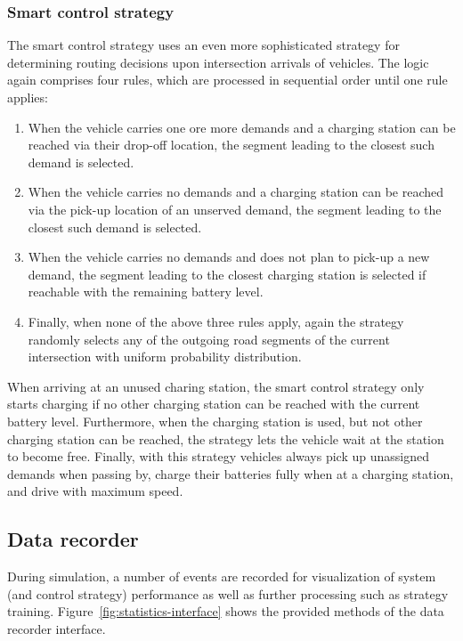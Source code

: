 \documentclass[a4paper,twoside]{article}
\begin{document}
	\subsubsection*{Smart control strategy}
	\label{sec:controller-smart}
	
	The smart control strategy uses an even more sophisticated strategy for determining routing decisions upon intersection arrivals of vehicles.
	The logic again comprises four rules, which are processed in sequential order until one rule applies:
	\begin{enumerate}
		\item When the vehicle carries one ore more demands and a charging station can be reached via their drop-off location, the segment leading to the closest such demand is selected.
		\item When the vehicle carries no demands and a charging station can be reached via the pick-up location of an unserved demand, the segment leading to the closest such demand is selected.
		\item When the vehicle carries no demands and does not plan to pick-up a new demand, the segment leading to the closest charging station is selected if reachable with the remaining battery level.
		\item Finally, when none of the above three rules apply, again the strategy randomly selects any of the outgoing road segments of the current intersection with uniform probability distribution.
	\end{enumerate}
	When arriving at an unused charing station, the smart control strategy only starts charging if no other charging station can be reached with the current battery level.
	Furthermore, when the charging station is used, but not other charging station can be reached, the strategy lets the vehicle wait at the station to become free.
	Finally, with this strategy vehicles always pick up unassigned demands when passing by, charge their batteries fully when at a charging station, and drive with maximum speed.
	
	\subsection{Data recorder}
	\label{sec:statistics-interface}
	
	During simulation, a number of events are recorded for visualization of system (and control strategy) performance as well as further processing such as strategy training.
	Figure~\ref{fig:statistics-interface} shows the provided methods of the data recorder interface.
	
\end{document}
